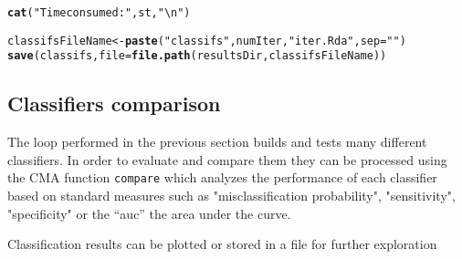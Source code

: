 \documentclass{article}\usepackage[]{graphicx}\usepackage[]{color}
\makeatletter
\newcommand{\hlstr}[1]{\textcolor[rgb]{0.192,0.494,0.8}{#1}}%
\newcommand{\hlstd}[1]{\textcolor[rgb]{0.345,0.345,0.345}{#1}}%
\newcommand{\hlkwb}[1]{\textcolor[rgb]{0.69,0.353,0.396}{#1}}%
\newcommand{\hlkwc}[1]{\textcolor[rgb]{0.333,0.667,0.333}{#1}}%
\newcommand{\hlkwd}[1]{\textcolor[rgb]{0.737,0.353,0.396}{\textbf{#1}}}%
\newenvironment{kframe}{%
 \def\at@end@of@kframe{}%
 \ifinner\ifhmode%
  \def\at@end@of@kframe{\end{minipage}}%
  \begin{minipage}{\columnwidth}%
 \fi\fi%
 \def\FrameCommand##1{\hskip\@totalleftmargin \hskip-\fboxsep
 \colorbox{shadecolor}{##1}\hskip-\fboxsep
     \hskip-\linewidth \hskip-\@totalleftmargin \hskip\columnwidth}%
 \MakeFramed {\advance\hsize-\width
   \@totalleftmargin\z@ \linewidth\hsize
   \@setminipage}}%
 {\par\unskip\endMakeFramed%
 \at@end@of@kframe}
\newenvironment{knitrout}{}{} %
\makeatother
\begin{document}
\begin{knitrout}
\begin{kframe}
{\ttfamily\noindent\color{warningcolor}{\#\# Warning: package 'class' was built under R version 3.1.3}}

{\ttfamily\noindent\color{warningcolor}{\#\# Warning in library(package, lib.loc = lib.loc, character.only = TRUE, logical.return = TRUE, : there is no package called 'randomForest'}}

{\ttfamily\noindent\bfseries{}}\begin{alltt}
\hlkwd{cat}\hlstd{(}\hlstr{"Time consumed: "}\hlstd{, st,} \hlstr{"\textbackslash{}n"}\hlstd{)}
\end{alltt}


{\ttfamily\noindent\bfseries{}}\begin{alltt}
\hlstd{classifsFileName} \hlkwb{<-} \hlkwd{paste}\hlstd{(}\hlstr{"classifs"}\hlstd{,numIter,}\hlstr{"iter.Rda"}\hlstd{,} \hlkwc{sep}\hlstd{=}\hlstr{""}\hlstd{)}
\hlkwd{save}\hlstd{(classifs,} \hlkwc{file}\hlstd{=}\hlkwd{file.path}\hlstd{(resultsDir,classifsFileName))}
\end{alltt}
\end{kframe}
\end{knitrout}

\subsection{Classifiers comparison}

The loop performed in the previous section builds and tests many different classifiers. In order to evaluate and compare them they can be processed using the CMA function \texttt{compare} which analyzes the performance of each classifier based on standard measures such as "misclassification probability", "sensitivity", "specificity" or the ``auc'' the area under the curve.

Classification results can be plotted or stored in a file for further exploration
\end{document}
